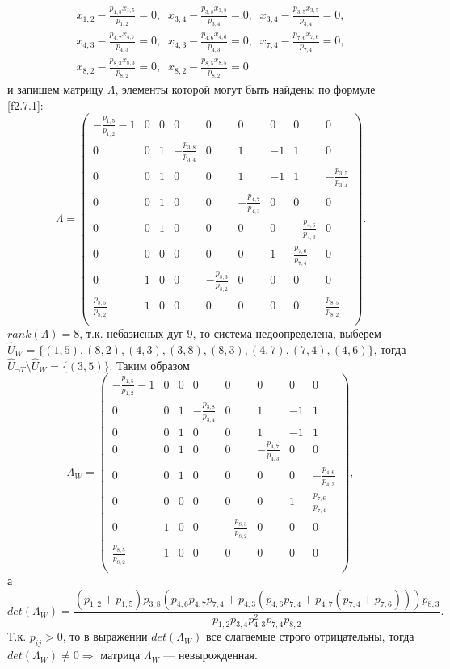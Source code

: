 \documentclass[14pt]{extarticle}%
\begin{document}
\begin{equation}\label{f3.1.23}
\begin{gathered}
x_{1,2}-\frac{p_{1,5} x_{1,5}}{p_{1,2}}=0,\;\;
x_{3,4}-\frac{p_{3,8} x_{3,8}}{p_{3,4}}=0,\;\;
x_{3,4}-\frac{p_{3,5} x_{3,5}}{p_{3,4}}=0,\\
x_{4,3}-\frac{p_{4,7} x_{4,7}}{p_{4,3}}=0,\;\;
x_{4,3}-\frac{p_{4,6} x_{4,6}}{p_{4,3}}=0,\;\;
x_{7,4}-\frac{p_{7,6} x_{7,6}}{p_{7,4}}=0,\\
x_{8,2}-\frac{p_{8,3} x_{8,3}}{p_{8,2}}=0,\;\;
x_{8,2}-\frac{p_{8,5} x_{8,5}}{p_{8,2}}=0
\end{gathered}
\end{equation}
и запишем матрицу $\Lambda$, элементы которой могут быть найдены по формуле \eqref{f2.7.1}:
$$
\Lambda=\left(
\begin{array}{ccccccccc}
 -\frac{p_{1,5}}{p_{1,2}}-1 & 0 & 0 & 0 & 0 & 0 & 0 & 0 & 0 \\
 0 & 0 & 1 & -\frac{p_{3,8}}{p_{3,4}} & 0 & 1 & -1 & 1 & 0 \\
 0 & 0 & 1 & 0 & 0 & 1 & -1 & 1 & -\frac{p_{3,5}}{p_{3,4}} \\
 0 & 0 & 1 & 0 & 0 & -\frac{p_{4,7}}{p_{4,3}} & 0 & 0 & 0 \\
 0 & 0 & 1 & 0 & 0 & 0 & 0 & -\frac{p_{4,6}}{p_{4,3}} & 0 \\
 0 & 0 & 0 & 0 & 0 & 0 & 1 & \frac{p_{7,6}}{p_{7,4}} & 0 \\
 0 & 1 & 0 & 0 & -\frac{p_{8,3}}{p_{8,2}} & 0 & 0 & 0 & 0 \\
 \frac{p_{8,5}}{p_{8,2}} & 1 & 0 & 0 & 0 & 0 & 0 & 0 & \frac{p_{8,5}}{p_{8,2}} \\
\end{array}
\right).
$$
$rank(\Lambda)=8$, т.к. небазисных дуг 9, то система недоопределена, выберем $\widehat{U}_W=\{(1 , 5), (8 , 2), (4 , 3), (3, 8), (8 , 3), (4 , 7), (7 , 4), (4 , 6)\}$, тогда $\widehat{U}_{\neg T}\setminus\widehat{U}_W=\{(3,5)\}$. Таким образом 
$$\Lambda_W=\left(
\begin{array}{cccccccc}
 -\frac{p_{1,5}}{p_{1,2}}-1 & 0 & 0 & 0 & 0 & 0 & 0 & 0 \\
 0 & 0 & 1 & -\frac{p_{3,8}}{p_{3,4}} & 0 & 1 & -1 & 1 \\
 0 & 0 & 1 & 0 & 0 & 1 & -1 & 1 \\
 0 & 0 & 1 & 0 & 0 & -\frac{p_{4,7}}{p_{4,3}} & 0 & 0 \\
 0 & 0 & 1 & 0 & 0 & 0 & 0 & -\frac{p_{4,6}}{p_{4,3}} \\
 0 & 0 & 0 & 0 & 0 & 0 & 1 & \frac{p_{7,6}}{p_{7,4}} \\
 0 & 1 & 0 & 0 & -\frac{p_{8,3}}{p_{8,2}} & 0 & 0 & 0 \\
 \frac{p_{8,5}}{p_{8,2}} & 1 & 0 & 0 & 0 & 0 & 0 & 0 \\
\end{array}
\right),$$
а 
$$det(\Lambda_W)=\frac{\left(p_{1,2}+p_{1,5}\right) p_{3,8} \left(p_{4,6} p_{4,7} p_{7,4}+p_{4,3} \left(p_{4,6} p_{7,4}+p_{4,7} \left(p_{7,4}+p_{7,6}\right)\right)\right) p_{8,3}}{p_{1,2} p_{3,4} p_{4,3}^2 p_{7,4} p_{8,2}}.$$
Т.к. $p_{ij}>0$, то в выражении $det(\Lambda_W)$ все слагаемые строго отрицательны, тогда $det(\Lambda_W)\neq 0 \Rightarrow$ матрица $\Lambda_W$ --- невырожденная. 
\end{document}
